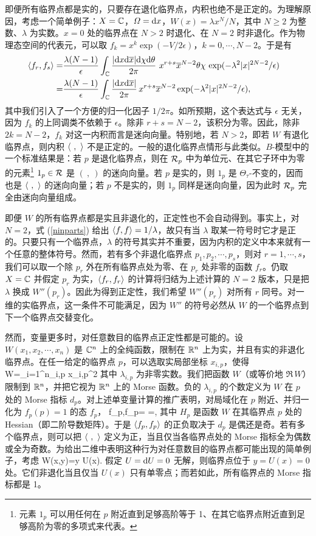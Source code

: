 即便所有临界点都是实的，只要存在退化临界点，内积也绝不是正定的。为理解原因，考虑一个简单例子：$X={\mathbb C}$，$\varOmega={\mathrm d} x$，$W(x)=\lambda x^N/N$，其中 $N\geq 2$ 为整数、$\lambda$ 为实数。$x=0$ 处的临界点在 $N>2$ 时退化、在 $N=2$ 时非退化。作为物理态空间的代表元，可以取 $f_k=x^k \exp(-V/2\epsilon)$，$k=0,\cdots, N-2$。于是有
\begin{align}\label{ninparts}\langle f_r,f_s\rangle=&\frac{\lambda(N-1)}{\epsilon}\int _{\mathbb C}\frac{|{\mathrm d} x{\mathrm d}\overline x|{\mathrm d}\chi{\mathrm d}\theta}{2\pi}\, \,x^{r+s}\overline x^{N-2}\theta\chi\, \exp(-\lambda^2|x|^{2N-2}/\epsilon) \cr
=&\frac{\lambda(N-1)}{\epsilon}\int _{\mathbb C}\frac{|{\mathrm d} x{\mathrm d}\overline x|}{2\pi} \,x^{r+s}\overline x^{N-2}\exp(-\lambda^2|x|^{2N-2}/\epsilon),\end{align}
其中我们引入了一个方便的归一化因子 $1/2\pi$。如所预期，这个表达式与 $\epsilon$ 无关，因为 $f_k$ 的上同调类不依赖于 $\epsilon$。除非 $r+s=N-2$，该积分为零。因此，除非 $2k=N-2$，$f_k$ 对这一内积而言是迷向向量。特别地，若 $N>2$，即若 $W$ 有退化临界点，则内积 $\langle~,~\rangle$ 不是正定的。一般的退化临界点情形与此类似。$B$-模型中的一个标准结果是：若 $p$ 是退化临界点，则在 ${\mathcal R}_p$ 中为单位元、在其它子环中为零的元素\footnote{元素 $1_p$ 可以用任何在 $p$ 附近直到足够高阶等于 1、在其它临界点附近直到足够高阶为零的多项式来代表。}  $1_p\in {\mathcal R}$ 是 $(~,~)$ 的迷向向量。若 $p$ 是实的，则 $1_p$ 是 $\Theta_\tau$-不变的，因而也是 $\langle~,~\rangle$ 的迷向向量；若 $p$ 不是实的，则 $1_p$ 同样是迷向向量，因为此时 ${\mathcal R}_p$ 完全由迷向向量组成。

即便 $W$ 的所有临界点都是实且非退化的，正定性也不会自动得到。事实上，对 $N=2$，式 (\ref{ninparts}) 给出 $\langle f,f\rangle=1/\lambda$，故只有当 $\lambda$ 取某一符号时它才是正的。只要只有一个临界点，$\lambda$ 的符号其实并不重要，因为内积的定义中本来就有一个任意的整体符号。然而，若有多个非退化临界点 $p_1,p_2,\cdots , p_s$，则对 $r=1,\cdots, s$，我们可以取一个除 $p_r$ 外在所有临界点处为零、在 $p_r$ 处非零的函数 $f_{r}$。仍取 $X={\mathbb C}$ 并假定 $p_r$ 为实，$\langle f_r,f_r\rangle$ 的计算将归结为上述计算的 $N=2$ 版本，只是把 $\lambda$ 换成 $W''(p_r)$。因此为得到正定性，我们希望 $W''(p_r)$ 对所有 $r$ 同号。对一维的实临界点，这一条件不可能满足，因为 $W''$ 的符号必然从 $W$ 的一个临界点到下一个临界点交替变化。

然而，变量更多时，对任意数目的临界点正定性都是可能的。设 $W(x_1,x_2,\cdots, x_n)$ 是 ${\mathbb C}^n$ 上的全纯函数，限制在 ${\mathbb R}^n$ 上为实，并且有实的非退化临界点。在任一给定的临界点 $p$，可以选取实局部坐标 $x_{i,p}$，使得
\be\label{morse} W=\sum_{i=1}^n\lambda_{i,p} x_{i,p}^2 \ee
其中 $\lambda_{i,p}$ 为非零实数。我们把函数 $W$（或等价地 $\Re\,W$）限制到 ${\mathbb R}^n$，并把它视为 ${\mathbb R}^n$ 上的 Morse 函数。负的 $\lambda_{i,p}$ 的个数定义为 $W$ 在 $p$ 处的 Morse 指标 $d_p$。对上述单变量计算的推广表明，对局域化在 $p$ 附近、并归一化为 $f_p(p)=1$ 的态 $f_p$，
\be\label{hessdet} \la f_p,f_p\ra= =, \ee
其中 $H_p$ 是函数 $W$ 在其临界点 $p$ 处的 Hessian（即二阶导数矩阵）。于是 $\langle f_p,f_p\rangle$ 的正负取决于 $d_p$ 是偶还是奇。若有多个临界点，则可以把 $\langle~,~\rangle$ 定义为正，当且仅当各临界点处的 Morse 指标全为偶数或全为奇数。为给出二维中表明这种行为对任意数目的临界点都可能出现的简单例子，考虑
\be\label{nvu} W(x,y)=y U(x). \ee
假定 $U={\mathrm d} U=0$ 无解，则临界点位于 $y=U(x)=0$ 处。它们非退化当且仅当 $U(x)$ 只有单零点；而若如此，所有临界点的 Morse 指标都是 1。

